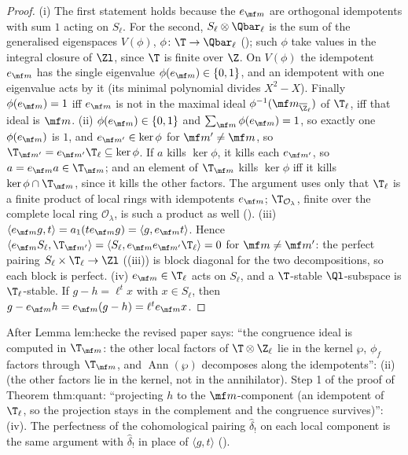 \begin{proof}
(i) The first statement holds because the $e_{\mf m}$ are orthogonal idempotents with sum $1$ acting on $S_\ell$. For the second, $S_\ell\otimes\Qbar_\ell$ is the sum of the generalised
eigenspaces $V(\phi)$, $\phi\colon\T\to\Qbar_\ell$ (); such $\phi$ take values in the integral closure of $\Zl$, since $\T$ is finite over $\Z$. On $V(\phi)$ the idempotent $e_{\mf m}$
has the single eigenvalue $\phi(e_{\mf m})\in\{0,1\}$, and an idempotent with one eigenvalue acts by it (its minimal polynomial divides $X^2-X$). Finally $\phi(e_{\mf m})=1$ iff $e_{\mf m}$ is not
in the maximal ideal $\phi^{-1}(\mf m_{\overline\Z_\ell})$ of $\T_\ell$, iff that ideal is $\mf m$. (ii) $\phi(e_{\mf m})\in\{0,1\}$ and $\sum_{\mf m}\phi(e_{\mf m})=1$, so exactly one $\phi(e_{\mf m})$ is $1$, and $e_{\mf m'}\in\ker\phi$
for $\mf m'\ne\mf m$, so $\T_{\mf m'}=e_{\mf m'}\T_\ell\subseteq\ker\phi$. If $a$ kills $\ker\phi$, it kills each $e_{\mf m'}$, so $a=e_{\mf m}a\in\T_{\mf m}$; and an element of $\T_{\mf m}$ kills $\ker\phi$ iff it kills
$\ker\phi\cap\T_{\mf m}$, since it kills the other factors. The argument uses only that $\T_\ell$ is a finite product of local rings with idempotents $e_{\mf m}$; $\T_{\mathcal O_\lambda}$, finite over the
complete local ring $\mathcal O_\lambda$, is such a product as well (). (iii) $\langle e_{\mf m}g,t\rangle=a_1(te_{\mf m}g)=\langle g,e_{\mf m}t\rangle$. Hence $\langle e_{\mf m}S_\ell,\T_{\mf m'}\rangle=\langle S_\ell,e_{\mf m}e_{\mf m'}\T_\ell\rangle=0$ for $\mf m\ne\mf m'$: the
perfect pairing $S_\ell\times\T_\ell\to\Zl$ ((iii)) is block diagonal for the two decompositions, so each block is perfect. (iv) $e_{\mf m}\in\T_\ell$ acts on $S_\ell$, and a
$\T$-stable $\Ql$-subspace is $\T_\ell$-stable. If $g-h=\ell^tx$ with $x\in S_\ell$, then $g-e_{\mf m}h=e_{\mf m}(g-h)=\ell^te_{\mf m}x$.
\end{proof}

\begin{paperlink}\label{pl:hecke:local}
After Lemma lem:hecke the revised paper says: ``the congruence ideal is computed in $\T_{\mf m}$: the other local factors of $\T\otimes\Z_\ell$ lie in the kernel $\wp$, $\phi_f$ factors through
$\T_{\mf m}$, and $\operatorname{Ann}(\wp)$ decomposes along the idempotents'': (ii) (the other factors lie in the kernel, not in the annihilator). Step 1 of the proof of
Theorem thm:quant: ``projecting $h$ to the $\mf m$-component (an idempotent of $\T_\ell$, so the projection stays in the complement and the congruence survives)'':
(iv). The perfectness of the cohomological pairing $\hat\delta_!$ on each local component is the same argument with $\hat\delta_!$ in place of $\langle g,t\rangle$
().
\end{paperlink}

